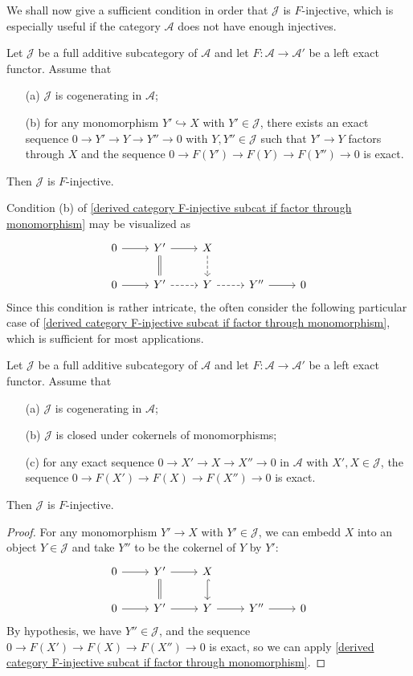 We shall now give a sufficient condition in order that $\mathcal{J}$ is $F$-injective, which is especially useful if the category $\mathcal{A}$ does not have enough injectives.

\begin{theorem}\label{derived category F-injective subcat if factor through monomorphism}
Let $\mathcal{J}$ be a full additive subcategory of $\mathcal{A}$ and let $F:\mathcal{A}\to\mathcal{A}'$ be a left exact functor. Assume that
\begin{enumerate}
    \item[(a)] $\mathcal{J}$ is cogenerating in $\mathcal{A}$;
    \item[(b)] for any monomorphism $Y'\hookrightarrow X$ with $Y'\in\mathcal{J}$, there exists an exact sequence $0\to Y'\to Y\to Y''\to 0$ with $Y,Y''\in\mathcal{J}$ such that $Y'\to Y$ factors through $X$ and the sequence $0\to F(Y')\to F(Y)\to F(Y'')\to 0$ is exact. 
\end{enumerate}
Then $\mathcal{J}$ is $F$-injective.
\end{theorem}
Condition (b) of \cref{derived category F-injective subcat if factor through monomorphism} may be visualized as
\[\begin{tikzcd}
0\ar[r]&Y'\ar[d,equal]\ar[r]&X\ar[d,dashed]\\
0\ar[r]&Y'\ar[r,dashed]&Y\ar[r,dashed]&Y''\ar[r]&0
\end{tikzcd}\]
Since this condition is rather intricate, the often consider the following particular case of \cref{derived category F-injective subcat if factor through monomorphism}, which is sufficient for most applications.
\begin{corollary}\label{derived category F-injective subcat if exact on cokernel of monomorphism}
Let $\mathcal{J}$ be a full additive subcategory of $\mathcal{A}$ and let $F:\mathcal{A}\to\mathcal{A}'$ be a left exact functor. Assume that
\begin{enumerate}
    \item[(a)] $\mathcal{J}$ is cogenerating in $\mathcal{A}$;
    \item[(b)] $\mathcal{J}$ is closed under cokernels of monomorphisms;
    \item[(c)] for any exact sequence $0\to X'\to X\to X''\to 0$ in $\mathcal{A}$ with $X',X\in\mathcal{J}$, the sequence $0\to F(X')\to F(X)\to F(X'')\to 0$ is exact.
\end{enumerate}
Then $\mathcal{J}$ is $F$-injective.
\end{corollary}
\begin{proof}
For any monomorphism $Y'\to X$ with $Y'\in\mathcal{J}$, we can embedd $X$ into an object $Y\in\mathcal{J}$ and take $Y''$ to be the cokernel of $Y$ by $Y'$:
\[\begin{tikzcd}
0\ar[r]&Y'\ar[d,equal]\ar[r]&X\ar[d,hook]\\
0\ar[r]&Y'\ar[r]&Y\ar[r]&Y''\ar[r]&0
\end{tikzcd}\]
By hypothesis, we have $Y''\in\mathcal{J}$, and the sequence $0\to F(X')\to F(X)\to F(X'')\to 0$ is exact, so we can apply \cref{derived category F-injective subcat if factor through monomorphism}.
\end{proof}
